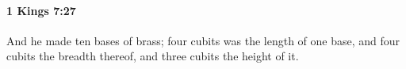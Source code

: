 
		\paragraph{1 Kings 7:27} %
			\label{1KINGS-7-27}

			And he made ten bases of brass; four cubits was the length of one base, and four cubits the breadth thereof, and three cubits the height of it.


